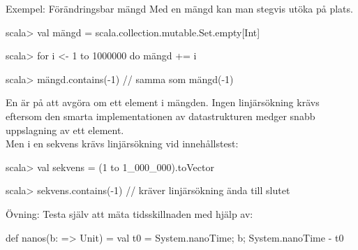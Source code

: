  
  




\begin{Slide}{Exempel: Förändringsbar mängd}\SlideFontSmall
Med en  mängd kan man stegvis utöka på plats.
\begin{REPL}
scala> val mängd = scala.collection.mutable.Set.empty[Int]

scala> for i <- 1 to 1000000 do mängd += i

scala> mängd.contains(-1)                     // samma som mängd(-1)
\end{REPL}
En  är  på att avgöra om ett element  i mängden. Ingen linjärsökning krävs eftersom den smarta implementationen av datastrukturen medger snabb uppslagning  av ett element.
\pause
\\\vspace{0.5em}Men i en sekvens krävs linjärsökning vid innehållstest:
\begin{REPL}
scala> val sekvens = (1 to 1_000_000).toVector

scala> sekvens.contains(-1)   // kräver linjärsökning ända till slutet
\end{REPL}
\pause\SlideFontTiny Övning: Testa själv att mäta tidsskillnaden med hjälp av:
\begin{Code}
def nanos(b: => Unit) = { val t0 = System.nanoTime; b; System.nanoTime - t0 }
\end{Code}

\end{Slide}






